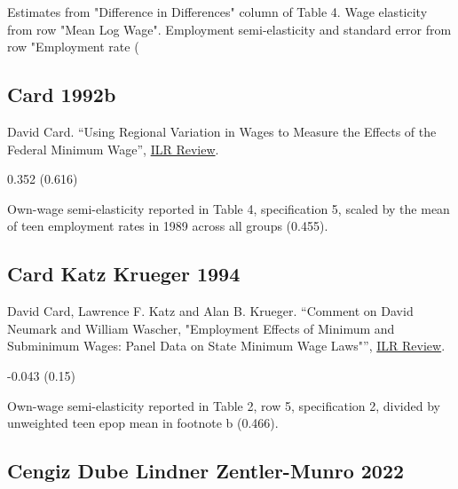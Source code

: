 \vspace{0.7em}

 Estimates from "Difference in Differences" column of Table 4. Wage elasticity from row "Mean Log Wage". Employment semi-elasticity and standard error from row "Employment rate (%

\subsection*{Card 1992b}
\vspace{-0.7em}

\noindent David Card. ``Using Regional Variation in Wages to Measure the Effects of the Federal Minimum Wage'', \href{https://doi.org/10.1177/001979399204600103}{ILR Review}.

\vspace{0.7em}

 0.352 (0.616)

\vspace{0.7em}

 Own-wage semi-elasticity reported in Table 4, specification 5, scaled by the mean of teen employment rates in 1989 across all groups (0.455).

\subsection*{Card Katz Krueger 1994}
\vspace{-0.7em}

\noindent David Card, Lawrence F. Katz and Alan B. Krueger. ``Comment on David Neumark and William Wascher, "Employment Effects of Minimum and Subminimum Wages: Panel Data on State Minimum Wage Laws"'', \href{https://doi.org/10.1177/001979399404700308}{ILR Review}.

\vspace{0.7em}

 -0.043 (0.15)

\vspace{0.7em}

 Own-wage semi-elasticity reported in Table 2, row 5, specification 2, divided by unweighted teen epop mean in footnote b (0.466).

\subsection*{Cengiz Dube Lindner Zentler-Munro 2022}
\vspace{-0.7em}

